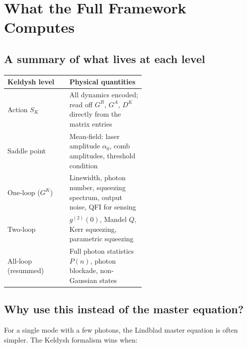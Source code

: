 \documentclass[12pt]{article}
\begin{document}
\section{What the Full Framework Computes}

\subsection{A summary of what lives at each level}

\begin{center}
\begin{tabular}{lp{0.55\linewidth}}
\toprule
Keldysh level & Physical quantities \\
\midrule
Action $S_K$ & All dynamics encoded; read off $G^R$, $G^A$, $D^K$
  directly from the matrix entries \\
Saddle point & Mean-field: laser amplitude $\alpha_0$, comb amplitudes,
  threshold condition \\
One-loop ($G^K$) & Linewidth, photon number, squeezing spectrum, output
  noise, QFI for sensing \\
Two-loop & $g^{(2)}(0)$, Mandel $Q$, Kerr squeezing, parametric squeezing \\
All-loop (resummed) & Full photon statistics $P(n)$, photon blockade,
  non-Gaussian states \\
\bottomrule
\end{tabular}
\end{center}

\subsection{Why use this instead of the master equation?}

For a single mode with a few photons, the Lindblad master equation
is often simpler. The Keldysh formalism wins when:
\end{document}
